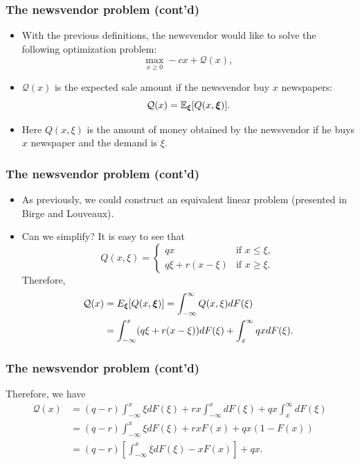 \documentclass{beamer}
\begin{document}
\begin{frame}
\frametitle{The newsvendor problem (cont'd)}

\begin{itemize}
\item
With the previous definitions, the newsvendor would like to solve the following optimization problem:
\[
\max_{x \geq 0} -cx + \mathcal{Q}(x),
\]
\item
$\mathcal{Q}(x)$ is the expected sale amount if the newsvendor buy $x$ newspapers:
\[
\mathcal{Q}(x) = {\mathbb{E}}_{{\boldsymbol{\xi}}} [ Q(x, {\boldsymbol{\xi}})].
\]
\item
Here $Q(x, \xi)$ is the amount of money obtained by the newsvendor if he buys $x$ newspaper and the demand is $\xi$.
\end{itemize}

\end{frame}

\begin{frame}
\frametitle{The newsvendor problem (cont'd)}

\begin{itemize}
\item
As previously, we could construct an equivalent linear problem (presented in Birge and Louveaux).
\item
Can we simplify? It is easy to see that
\[
Q(x, \xi) =
\begin{cases} 
qx & \mbox{if } x \leq \xi, \\
q\xi + r(x - \xi) & \mbox{if } x \geq \xi.
\end{cases}
\]
Therefore,
\begin{align*}
\mathcal{Q}(x) & = E_{{\boldsymbol{\xi}}} [ Q(x, {\boldsymbol{\xi}}) ] =
\int_{-\infty}^{\infty} Q(x, \xi) dF(\xi) 
\\ & = \int_{-\infty}^x(q\xi + r(x - \xi))dF(\xi) + \int^{\infty}_x
qxdF(\xi).
\end{align*}
\end{itemize}

\end{frame}

\begin{frame}
\frametitle{The newsvendor problem (cont'd)}

Therefore, we have
\begin{align*}
\mathcal{Q}(x) & = (q-r) \int_{-\infty}^x \xi dF(\xi) + rx
\int_{-\infty}^x dF(\xi) + qx \int_x^{\infty} dF(\xi) \\
& = (q-r) \int_{-\infty}^x \xi dF(\xi) + rx F(x) + qx (1-F(x)) \\
& = (q-r) \left[ \int_{-\infty}^x \xi dF(\xi) - x F(x) \right] + qx. \\
\end{align*}

\end{frame}
\end{document}

